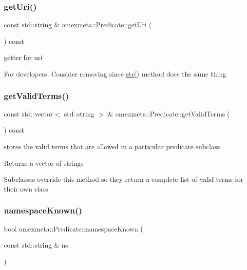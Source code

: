 \subsubsection{\texorpdfstring{get\+Uri()}{getUri()}}
{\footnotesize\ttfamily const std\+::string \& omexmeta\+::\+Predicate\+::get\+Uri (\begin{DoxyParamCaption}{ }\end{DoxyParamCaption}) const}



getter for uri 

For developers. Consider removing since \hyperlink{classomexmeta_1_1Predicate_a9d51ebf565f39fb4d6d4f58c1b030edf}{str()} method does the same thing \mbox{\label{classomexmeta_1_1Predicate_aee19b8fc8b21f8e5ffd5b64691e1e530}} 
\subsubsection{\texorpdfstring{get\+Valid\+Terms()}{getValidTerms()}}
{\footnotesize\ttfamily const std\+::vector$<$ std\+::string $>$ \& omexmeta\+::\+Predicate\+::get\+Valid\+Terms (\begin{DoxyParamCaption}{ }\end{DoxyParamCaption}) const}



stores the valid terms that are allowed in a particular predicate subclass 

\begin{DoxyReturn}{Returns}
a vector of strings
\end{DoxyReturn}
Subclasses override this method so they return a complete list of valid terms for their own class \mbox{\label{classomexmeta_1_1Predicate_a8381c8b0c7bbaa27de29608cbff08bf5}} 
\subsubsection{\texorpdfstring{namespace\+Known()}{namespaceKnown()}}
{\footnotesize\ttfamily bool omexmeta\+::\+Predicate\+::namespace\+Known (\begin{DoxyParamCaption}\item[{const std\+::string \&}]{ns }\end{DoxyParamCaption})\hspace{0.3cm}{\ttfamily [static]}}



